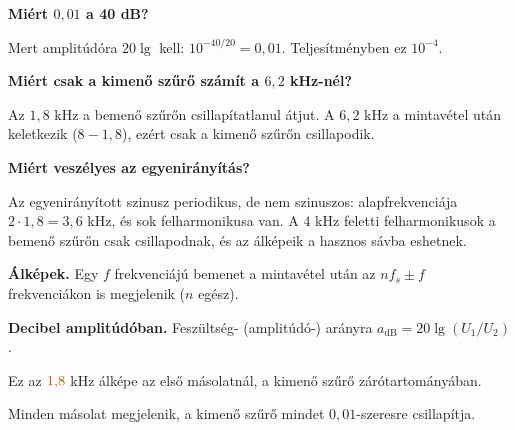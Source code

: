 \begin{elmelet}
\textbf{Miért $0{,}01$ a 40 dB?}\par Mert amplitúdóra $20\lg$ kell: $10^{-40/20}=0{,}01$. Teljesítményben ez $10^{-4}$.

\textbf{Miért csak a kimenő szűrő számít a $6{,}2$ kHz-nél?}\par Az $1{,}8$ kHz a bemenő szűrőn csillapítatlanul átjut. A $6{,}2$ kHz a mintavétel után keletkezik ($8-1{,}8$), ezért csak a kimenő szűrőn csillapodik.

\textbf{Miért veszélyes az egyenirányítás?}\par Az egyenirányított szinusz periodikus, de nem szinuszos: alapfrekvenciája $2\cdot1{,}8=3{,}6$ kHz, és sok felharmonikusa van. A $4$ kHz feletti felharmonikusok a bemenő szűrőn csak csillapodnak, és az álképeik a hasznos sávba eshetnek.
\end{elmelet}
\begin{elmelet}
\textbf{Álképek.} Egy $f$ frekvenciájú bemenet a mintavétel után az $n f_s\pm f$ frekvenciákon is megjelenik ($n$ egész).

\textbf{Decibel amplitúdóban.} Feszültség- (amplitúdó-) arányra $a_\mathrm{dB}=20\lg(U_1/U_2)$.
\begin{center}\end{center}

\end{elmelet}

Ez az ${\cb{1{,}8}}$ kHz álképe az első másolatnál, a kimenő szűrő zárótartományában.

\begin{center}\end{center}

\begin{center}\end{center}

Minden másolat megjelenik, a kimenő szűrő mindet $0{,}01$-szeresre csillapítja.

\begin{center}\end{center}

